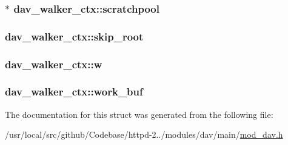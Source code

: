 \subsubsection[{\texorpdfstring{scratchpool}{scratchpool}}]{$\ast$ dav\+\_\+walker\+\_\+ctx\+::scratchpool}\hypertarget{structdav__walker__ctx_a86c199dadc816b5fd8b6a70f1e1edbcc}{}\label{structdav__walker__ctx_a86c199dadc816b5fd8b6a70f1e1edbcc}
\subsubsection[{\texorpdfstring{skip\+\_\+root}{skip_root}}]{ dav\+\_\+walker\+\_\+ctx\+::skip\+\_\+root}\hypertarget{structdav__walker__ctx_aea5a12dc0690c2a329ceeace753fcef9}{}\label{structdav__walker__ctx_aea5a12dc0690c2a329ceeace753fcef9}
\subsubsection[{\texorpdfstring{w}{w}}]{ dav\+\_\+walker\+\_\+ctx\+::w}\hypertarget{structdav__walker__ctx_a0139e9bc9666780fd522efd2b48fd599}{}\label{structdav__walker__ctx_a0139e9bc9666780fd522efd2b48fd599}
\subsubsection[{\texorpdfstring{work\+\_\+buf}{work_buf}}]{ dav\+\_\+walker\+\_\+ctx\+::work\+\_\+buf}\hypertarget{structdav__walker__ctx_a335d8f8a2fc9d74e627b07f87f2ffe76}{}\label{structdav__walker__ctx_a335d8f8a2fc9d74e627b07f87f2ffe76}


The documentation for this struct was generated from the following file\+:\begin{DoxyCompactItemize}
\item 
/usr/local/src/github/\+Codebase/httpd-\/2../modules/dav/main/\hyperlink{mod__dav_8h}{mod\+\_\+dav.\+h}\end{DoxyCompactItemize}
